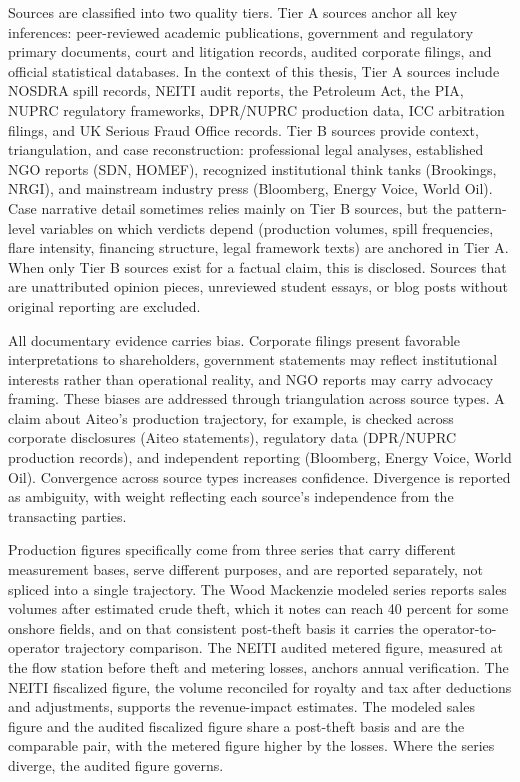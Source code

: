 Sources are classified into two quality tiers. Tier A sources anchor all
key inferences: peer-reviewed academic publications, government and
regulatory primary documents, court and litigation records, audited
corporate filings, and official statistical databases. In the context of
this thesis, Tier A sources include NOSDRA spill records, NEITI audit
reports, the Petroleum Act, the PIA, NUPRC regulatory frameworks,
DPR/NUPRC production data, ICC arbitration filings, and UK Serious Fraud
Office records. Tier B sources provide context, triangulation, and case
reconstruction: professional legal analyses, established NGO reports
(SDN, HOMEF), recognized institutional think tanks (Brookings, NRGI),
and mainstream industry press (Bloomberg, Energy Voice, World Oil). Case
narrative detail sometimes relies mainly on Tier B sources, but the
pattern-level variables on which verdicts depend (production volumes,
spill frequencies, flare intensity, financing structure, legal framework
texts) are anchored in Tier A. When only Tier B sources exist for a
factual claim, this is disclosed. Sources that are unattributed opinion
pieces, unreviewed student essays, or blog posts without original
reporting are excluded.

All documentary evidence carries bias. Corporate filings present
favorable interpretations to shareholders, government statements may
reflect institutional interests rather than operational reality, and NGO
reports may carry advocacy framing. These biases are addressed through
triangulation across source types. A claim about Aiteo's production
trajectory, for example, is checked across corporate disclosures (Aiteo
statements), regulatory data (DPR/NUPRC production records), and
independent reporting (Bloomberg, Energy Voice, World Oil). Convergence
across source types increases confidence. Divergence is reported as
ambiguity, with weight reflecting each source's independence from the
transacting parties.

Production figures specifically come from three series that carry
different measurement bases, serve different purposes, and are reported
separately, not spliced into a single trajectory. The Wood Mackenzie
modeled series reports sales volumes after estimated crude theft, which
it notes can reach 40 percent for some onshore fields, and on that
consistent post-theft basis it carries the operator-to-operator
trajectory comparison. The NEITI audited metered figure, measured at the
flow station before theft and metering losses, anchors annual
verification. The NEITI fiscalized figure, the volume reconciled for
royalty and tax after deductions and adjustments, supports the
revenue-impact estimates. The modeled sales figure and the audited
fiscalized figure share a post-theft basis and are the comparable pair,
with the metered figure higher by the losses. Where the series diverge,
the audited figure governs.

